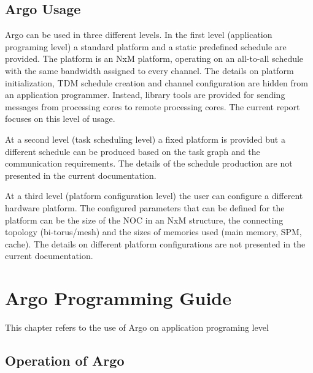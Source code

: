 \documentclass[a4paper,fontsize=10pt,twoside,DIV15,BCOR12mm,headinclude=true,footinclude=false,pagesize,bibtotoc]{scrbook}
\begin{document}
\section{Argo Usage}

Argo can be used in three different levels. In the first level (application programing level)
a standard platform and a static predefined schedule are provided. The platform is an NxM platform,%
operating on an all-to-all schedule with the same bandwidth assigned to every channel. The details 
on platform initialization, TDM schedule creation and channel configuration are hidden from an
application programmer. Instead, library tools are provided for sending messages from
processing cores to remote processing cores. The current report focuses on this level of usage.

At a second level (task scheduling level) a fixed platform is provided but a different schedule 
can be produced based on the task graph and the communication requirements. The details of the schedule
production are not presented in the current documentation.

At a third level (platform configuration level) the user can configure a different hardware platform.
The configured parameters that can be defined for the platform can be the size of the NOC in an NxM structure,
the connecting topology (bi-torus/mesh) and the sizes of memories used (main memory, SPM, cache).
The details on different platform configurations are not presented in the current documentation.




\chapter{Argo Programming Guide}
\label{chap:program}

This chapter refers to the use of Argo on application programing level

\section{Operation of Argo}
\label{sec:oper}
\end{document}
